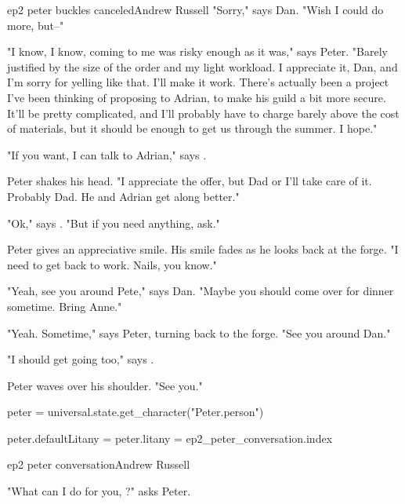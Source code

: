 \documentclass{book}
\begin{document}
\begin{childnode}{ep2 peter buckles canceled}{Andrew Russell}
    "Sorry," says Dan. "Wish I could do more, but--"

    "I know, I know, coming to me was risky enough as it was," says Peter. "Barely justified by the size of the order and my light workload. I appreciate it, Dan, and I'm sorry for yelling like that. I'll make it work. There's actually been a project I've been
    thinking of proposing to Adrian, to make his guild a bit more secure. It'll be pretty complicated, and I'll probably have to charge barely above the cost of materials, but it should be enough to get us through the summer. I hope."

    "If you want, I can talk to Adrian," says \name{}.

    Peter shakes his head. "I appreciate the offer, but Dad or I'll take care of it. Probably Dad. He and Adrian get along better."

    "Ok," says \name{}. "But if you need anything, ask."

    Peter gives \name{} an appreciative smile. His smile fades as he looks back at the forge. "I need to get back to work. Nails, you know."

    "Yeah, see you around Pete," says Dan. "Maybe you should come over for dinner sometime. Bring Anne."

    "Yeah. Sometime," says Peter, turning back to the forge. "See you around Dan."

    "I should get going too," says \name{}.

    Peter waves over his shoulder. "See you."

    \begin{code}

        peter = universal.state.get_character("Peter.person")

        peter.defaultLitany = peter.litany = ep2_peter_conversation.index

    \end{code}

\end{childnode}

\begin{childnode}{ep2 peter conversation}{Andrew Russell}

    "What can I do for you, \name{}?" asks Peter. 



\end{childnode}
\end{document}
